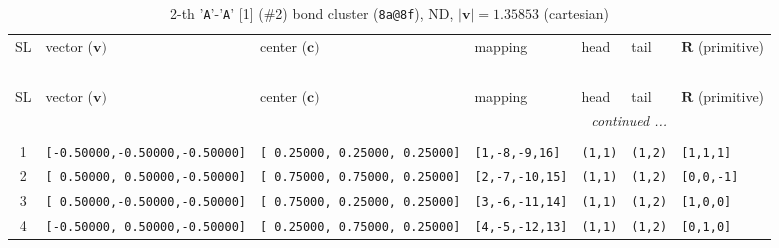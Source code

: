 \documentclass[fleqn,10pt,landscape]{jsarticle}
\begin{document}
\begin{longtable}[l]{cllllll}
\captionsetup{justification=raggedright, singlelinecheck=off}
\caption{2-th '\texttt{A}'-'\texttt{A}' [1] (\#2) bond cluster (\texttt{8a@8f}), ND, $|\bm{v}|=1.35853$ (cartesian)}
 \\
 \hline \hline
SL & vector ($\bm{v})$ & center ($\bm{c})$ & mapping & head & tail & $\bm{R}$ (primitive) \\ \hline \endfirsthead

\multicolumn{6}{l}{\tablename\ \thetable{}} \\
 \hline \hline
SL & vector ($\bm{v})$ & center ($\bm{c})$ & mapping & head & tail & $\bm{R}$ (primitive) \\ \hline \endhead

 \hline \hline
\multicolumn{6}{r}{\footnotesize\it continued ...} \\ \endfoot

 \hline \hline
\multicolumn{6}{r}{} \\ \endlastfoot

1 & \texttt{[-0.50000,-0.50000,-0.50000]} & \texttt{[ 0.25000, 0.25000, 0.25000]} & \texttt{[1,-8,-9,16]} & \texttt{(1,1)} & \texttt{(1,2)} & \texttt{[1,1,1]} \\ \hline
2 & \texttt{[ 0.50000, 0.50000,-0.50000]} & \texttt{[ 0.75000, 0.75000, 0.25000]} & \texttt{[2,-7,-10,15]} & \texttt{(1,1)} & \texttt{(1,2)} & \texttt{[0,0,-1]} \\ \hline
3 & \texttt{[ 0.50000,-0.50000,-0.50000]} & \texttt{[ 0.75000, 0.25000, 0.25000]} & \texttt{[3,-6,-11,14]} & \texttt{(1,1)} & \texttt{(1,2)} & \texttt{[1,0,0]} \\ \hline
4 & \texttt{[-0.50000, 0.50000,-0.50000]} & \texttt{[ 0.25000, 0.75000, 0.25000]} & \texttt{[4,-5,-12,13]} & \texttt{(1,1)} & \texttt{(1,2)} & \texttt{[0,1,0]} \\
\end{longtable}
\end{document}
